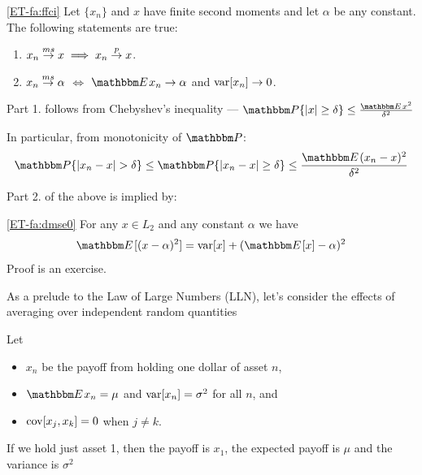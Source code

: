 \begin{frame}
    
    \vspace{2em}
    \Fact\eqref{ET-fa:ffci}
    Let $\{x_n\}$ and $x$ have finite second moments and let $\alpha$ be any
    constant.  The following statements are true:
    \begin{enumerate}
        \item $x_n \stackrel { ms } {\to} x \implies x_n \stackrel { p } {\to} x$.
        \item $x_n \stackrel { ms } {\to} \alpha$ $\iff$ $\EE x_n \to \alpha$ and $\operatorname{var}[x_n]
            \to 0$.
    \end{enumerate}
    
    \vspace{1em}
    Part 1. follows from Chebyshev's inequality --- $\PP\{|x| \geq \delta \} \leq \frac{\EE x^2}{\delta^2}$
    
    In particular, from monotonicity of $\PP$:
    \begin{equation*}
        \PP\{|x_n - x| > \delta \} 
        \leq \PP\{|x_n - x| \geq \delta \} 
        \leq \frac{\EE (x_n - x)^2}{\delta^2}
    \end{equation*}
\end{frame}

\begin{frame}

    \vspace{2em}
    Part 2. of the above is implied by:
    
    \Fact\eqref{ET-fa:dmse0}
        For any $x \in L_2$ and any constant $\alpha$ we have
        \begin{equation}
            \label{eq:dmse0}
            \EE [ (x - \alpha)^2 ] = \var[x] + (\EE[x] - \alpha)^2
        \end{equation}
    Proof is an exercise. 
    

\end{frame}

\begin{frame}
    
    \vspace{2em}
    As a prelude to the Law of Large Numbers (LLN), let's consider the
    effects of averaging over independent random quantities
    
    Let 
    \begin{itemize}
        \item $x_n$ be the payoff from holding one dollar of asset $n$,
        \item $\EE x_n = \mu$ and $\operatorname{var}[x_n] = \sigma^2$ for all $n$, and
        \item $\operatorname{cov}[x_j, x_k] = 0$ when $j \not= k$.
    \end{itemize}
    
    \vspace{1em}
    If we hold just asset 1, then the payoff is $x_1$, the expected payoff is $\mu$
    and the variance is $\sigma^2$
    
\end{frame}


